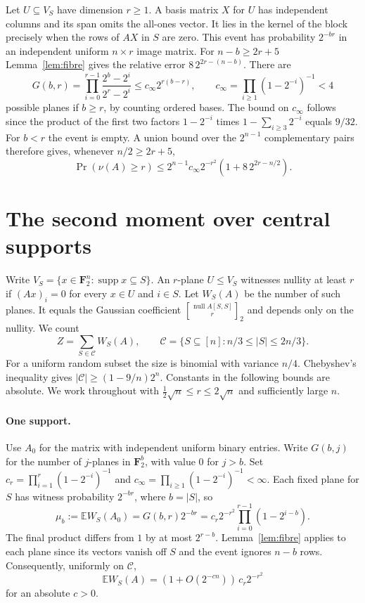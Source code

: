 \documentclass[11pt]{article}
\theoremstyle{remark}\newtheorem*{remark}{Remark}
\begin{document}
Let $U\subseteq V_S$ have dimension $r\ge1$. A basis matrix $X$ for $U$ has independent columns and its span omits the all-ones vector. It lies in the kernel of the block precisely when the rows of $AX$ in $S$ are zero. This event has probability $2^{-br}$ in an independent uniform $n\times r$ image matrix. For $n-b\ge2r+5$ Lemma~\ref{lem:fibre} gives the relative error $8\,2^{2r-(n-b)}$. There are
\[
 G(b,r)=\prod_{i=0}^{r-1}\frac{2^b-2^i}{2^r-2^i}
 \le c_\infty 2^{r(b-r)},\qquad
 c_\infty=\prod_{i\ge1}(1-2^{-i})^{-1}<4
\]
possible planes if $b\ge r$, by counting ordered bases. The bound on $c_\infty$ follows since the product of the first two factors $1-2^{-i}$ times $1-\sum_{i\ge3}2^{-i}$ equals $9/32$. For $b<r$ the event is empty. A union bound over the $2^{n-1}$ complementary pairs therefore gives, whenever $n/2\ge2r+5$,
\begin{equation}\label{eq:upper}
 \Pr(\nu(A)\ge r)\le 2^{n-1}c_\infty 2^{-r^2}
      (1+8\,2^{2r-n/2}).
\end{equation}
\section{The second moment over central supports}
\label{sec:lower}

Write $V_S=\{x\in\mathbf F_2^n:\operatorname{supp}x\subseteq S\}$.
An $r$-plane $U\le V_S$ witnesses nullity at least $r$ if
$(Ax)_i=0$ for every $x\in U$ and $i\in S$.
Let $W_S(A)$ be the number of such planes. It equals the Gaussian
coefficient $\genfrac{[}{]}{0pt}{}{\operatorname{null} A[S,S]}{r}_2$
and depends only on the nullity. We count
\[
 Z=\sum_{S\in\mathcal C} W_S(A),\qquad
 \mathcal C=\{S\subseteq[n]: n/3\le |S|\le 2n/3\}.
\]
For a uniform random subset the size is binomial with variance $n/4$.
Chebyshev's inequality gives $|\mathcal C|\ge(1-9/n)2^n$.
Constants in the following bounds are absolute. We work throughout with
$\tfrac12\sqrt n\le r\le 2\sqrt n$ and sufficiently large $n$.

\paragraph{One support.}
Use $A_0$ for the matrix with independent uniform binary entries.
Write $G(b,j)$ for the number of $j$-planes in $\mathbf F_2^b$,
with value $0$ for $j>b$. Set
$c_r=\prod_{i=1}^r(1-2^{-i})^{-1}$ and
$c_\infty=\prod_{i\ge1}(1-2^{-i})^{-1}<\infty$.
Each fixed plane for $S$ has witness probability $2^{-br}$, where
$b=|S|$, so
\[
 \mu_b:=\mathbb E W_S(A_0)
 =G(b,r)2^{-br}
 =c_r2^{-r^2}\prod_{i=0}^{r-1}(1-2^{i-b}).
\]
The final product differs from $1$ by at most $2^{r-b}$.
Lemma~\ref{lem:fibre} applies to each plane since its vectors vanish
off $S$ and the event ignores $n-b$ rows. Consequently, uniformly on
$\mathcal C$,
\begin{equation}\label{eq:onecentral}
 \mathbb E W_S(A)=(1+O(2^{-c n}))\,c_r2^{-r^2}
\end{equation}
for an absolute $c>0$.
\end{document}
